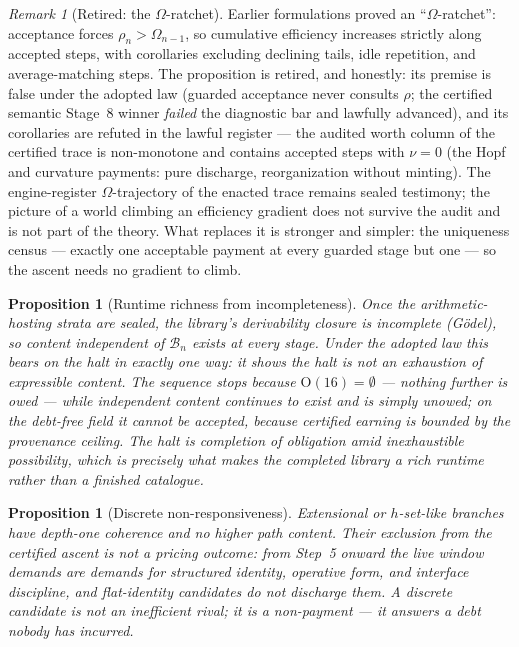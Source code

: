 \documentclass[11pt]{article}
\theoremstyle{plain}
\newtheorem{proposition}[theorem]{Proposition}
\theoremstyle{definition}
\theoremstyle{remark}
\newtheorem{remark}[theorem]{Remark}
\newcommand{\B}{\mathcal{B}}
\begin{document}
\begin{remark}[Retired: the \(\Omega\)-ratchet]
Earlier formulations proved an ``\(\Omega\)-ratchet'': acceptance forces \(\rho_n>\Omega_{n-1}\), so cumulative efficiency increases strictly along accepted steps, with corollaries excluding declining tails, idle repetition, and average-matching steps. The proposition is retired, and honestly: its premise is false under the adopted law (guarded acceptance never consults \(\rho\); the certified semantic Stage~8 winner \emph{failed} the diagnostic bar and lawfully advanced), and its corollaries are refuted in the lawful register --- the audited worth column of the certified trace is non-monotone and contains accepted steps with \(\nu=0\) (the Hopf and curvature payments: pure discharge, reorganization without minting). The engine-register \(\Omega\)-trajectory of the enacted trace remains sealed testimony; the picture of a world climbing an efficiency gradient does not survive the audit and is not part of the theory. What replaces it is stronger and simpler: the uniqueness census --- exactly one acceptable payment at every guarded stage but one --- so the ascent needs no gradient to climb.
\end{remark}

\begin{proposition}[Runtime richness from incompleteness]
Once the arithmetic-hosting strata are sealed, the library's derivability closure is incomplete (G\"odel), so content independent of \(\B_n\) exists at every stage. Under the adopted law this bears on the halt in exactly one way: it shows the halt is \emph{not} an exhaustion of expressible content. The sequence stops because \(\mathrm{O}(16)=\emptyset\) --- nothing further is owed --- while independent content continues to exist and is simply unowed; on the debt-free field it cannot be accepted, because certified earning is bounded by the provenance ceiling. The halt is completion of obligation amid inexhaustible possibility, which is precisely what makes the completed library a rich runtime rather than a finished catalogue.
\end{proposition}

\begin{proposition}[Discrete non-responsiveness]
Extensional or \(h\)-set-like branches have depth-one coherence and no higher path content. Their exclusion from the certified ascent is not a pricing outcome: from Step~5 onward the live window demands are demands for structured identity, operative form, and interface discipline, and flat-identity candidates do not discharge them. A discrete candidate is not an inefficient rival; it is a non-payment --- it answers a debt nobody has incurred.
\end{proposition}
\end{document}
